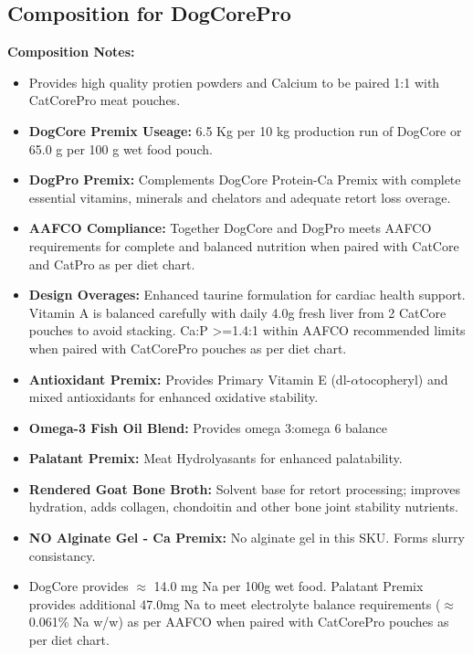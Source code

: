 \subsection*{Composition for DogCorePro}
\noindent\textbf{Composition Notes:}
\begin{itemize}
\item{} Provides high quality protien powders and Calcium to be paired 1:1 with CatCorePro meat pouches.
\item \textbf{DogCore Premix Useage: }6.5 Kg per 10 kg production run of DogCore or 65.0 g per 100 g wet food pouch.
\item \textbf{DogPro Premix: } Complements DogCore Protein-Ca Premix with complete essential vitamins, minerals and chelators and adequate retort loss overage. 
\item\textbf{AAFCO Compliance: } Together DogCore and DogPro meets AAFCO requirements for complete and balanced nutrition when paired with CatCore and CatPro as per diet chart. 
\item\textbf{Design Overages: }Enhanced taurine formulation for cardiac health support. Vitamin A is balanced carefully with daily 4.0g fresh liver from 2 CatCore pouches to avoid stacking. Ca:P >=1.4:1 within AAFCO recommended limits when paired with CatCorePro pouches as per diet chart. 
\item \textbf{Antioxidant Premix: } Provides Primary Vitamin E (dl-$\alpha$tocopheryl) and mixed antioxidants for enhanced oxidative stability.
\item \textbf{Omega-3 Fish Oil Blend:} Provides omega 3:omega 6  balance
\item \textbf{Palatant Premix: } Meat Hydrolyasants for enhanced palatability.
\item\textbf {Rendered Goat Bone Broth: } Solvent base for retort processing; improves hydration, adds collagen, chondoitin and other bone joint stability nutrients. 
\item \textbf{NO Alginate Gel - Ca Premix:} No alginate gel in this SKU. Forms slurry consistancy. 
\item {} DogCore provides $\approx$ 14.0 mg Na per 100g wet food. Palatant Premix provides additional 47.0mg Na to meet electrolyte balance requirements ($\approx$ 0.061\% Na w/w) as per AAFCO when paired with CatCorePro pouches as per diet chart. 
\end{itemize}

